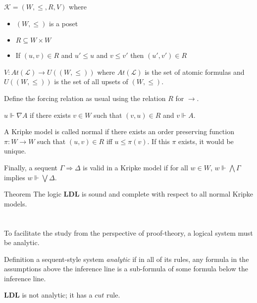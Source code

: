 \documentclass[handout]{beamer}
\begin{document}
\begin{frame}{\subKripSemantics}
	$\mathcal{K}=(W, \leq, R, V)$ where
	\begin{itemize}
		\item $(W, \leq)$ is a poset
		\item $R \subseteq W \times W$
		\item If $(u, v) \in R$ and $u' \leq u$ and $v \leq v'$ then $(u', v') \in R$
	\end{itemize}
	$V: At(\mathcal{L}) \to U((W, \leq))$ where $At(\mathcal{L})$ is the set of atomic formulas and $U((W, \leq))$ is the set of all upsets of $(W, \leq)$.

	Define the forcing relation as usual using the relation $R$ for $\to$.
	
	\begin{block}{}
		$u \Vdash \nabla A$ if there exists $v \in W$ such that $(v, u) \in R$ and $v \Vdash A$.		
	\end{block}
	
	
	A Kripke model is called normal if there exists an order preserving function $\pi : W \to W$ such that $(u, v) \in R$ iff $u \leq \pi(v)$. If this $\pi$ exists, it would be unique.
\end{frame}

\begin{frame}{\subKripSemantics}
	\begin{block}{}
		Finally, a sequent $\Gamma \Rightarrow \Delta$ is valid in a Kripke model if for all $w \in W$, $w \Vdash \bigwedge \Gamma$ implies $w \Vdash \bigvee \Delta$.
	\end{block}\quad
	\vspace*{5mm}
	\begin{exampleblock}{Theorem}
		The logic $\mathbf{LDL}$ is sound and complete with respect to all normal Kripke models.
	\end{exampleblock}
\end{frame}

\section{\secProposal}

\begin{frame}{\subAnalytic}
	To facilitate the study from the perspective of proof-theory, a logical system must be analytic.

	\begin{block}{Definition}
		a sequent-style system \emph{analytic} if in all of its rules, any formula in the assumptions above the inference line is a sub-formula of some formula below the inference line.
		\vspace{1ex}
	\end{block}

	$\mathbf{LDL}$ is not analytic; it has a $cut$ rule.
	\begin{block}{}
		\begin{prooftree}
			\BIC{$\Gamma, \Sigma \Rightarrow \Delta$}
		\end{prooftree}
	\end{block}
\end{frame}
\end{document}
